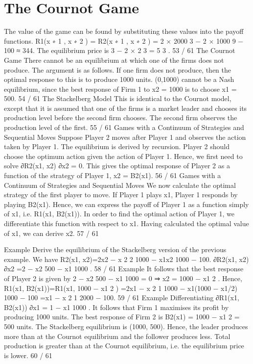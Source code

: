 \section{The Cournot Game}
The value of the game can be found by substituting these values
into the payoff functions.
R1(x
∗
1
, x
∗
2
) = R2(x
∗
1
, x
∗
2
) = 2 ×
2000
3
− 2 ×
1000
9
− 100 ≈ 344.
The equilibrium price is 3 − 2 ×
2
3 =
5
3
.
53 / 61
The Cournot Game
There cannot be an equilibrium at which one of the firms does not
produce. The argument is as follows.
If one firm does not produce, then the optimal response to this is
to produce 1000 units.
(0,1000) cannot be a Nash equilibrium, since the best response of
Firm 1 to x2 = 1000 is to choose x1 = 500.
54 / 61
The Stackelberg Model
This is identical to the Cournot model, except that it is assumed
that one of the firms is a market leader and chooses its production
level before the second firm chooses.
The second firm observes the production level of the first.
55 / 61
Games with a Continuum of Strategies and Sequential
Moves
Suppose Player 2 moves after Player 1 and observes the action
taken by Player 1. The equilibrium is derived by recursion.
Player 2 should choose the optimum action given the action of
Player 1.
Hence, we first need to solve
∂R2(x1, x2)
∂x2
= 0.
This gives the optimal response of Player 2 as a function of the
strategy of Player 1, x2 = B2(x1).
56 / 61
Games with a Continuum of Strategies and Sequential
Moves
We now calculate the optimal strategy of the first player to move.
If Player 1 plays x1, Player 1 responds by playing B2(x1). Hence,
we can express the payoff of Player 1 as a function simply of x1,
i.e. R1(x1, B2(x1)).
In order to find the optimal action of Player 1, we differentiate this
function with respect to x1.
Having calculated the optimal value of x1, we can derive x2.
57 / 61

Example
Derive the equilibrium of the Stackelberg version of the previous
example.
We have
R2(x1, x2)=2x2 −
x
2
2
1000
−
x1x2
1000
− 100.
∂R2(x1, x2)
∂x2
=2 −
x2
500
−
x1
1000
.
58 / 61
Example
It follows that the best response of Player 2 is given by
2 −
x2
500
−
x1
1000
= 0 ⇒ x2 = 1000 −
x1
2
.
Hence,
R1(x1, B2(x1))=R1(x1, 1000 −
x1
2
)
=2x1 −
x
2
1
1000
−
x1(1000 − x1/2)
1000
− 100
=x1 −
x
2
1
2000
− 100.
59 / 61
Example
Differentiating
∂R1(x1, B2(x1))
∂x1
= 1 −
x1
1000
.
It follows that Firm 1 maximises its profit by producing 1000 units.
The best response of Firm 2 is B2(x1) = 1000 −
x1
2 = 500 units.
The Stackelberg equilibrium is (1000, 500). Hence, the leader
produces more than at the Cournot equilibrium and the follower
produces less.
Total production is greater than at the Cournot equilibrium, i.e.
the equilibrium price is lower.
60 / 61

